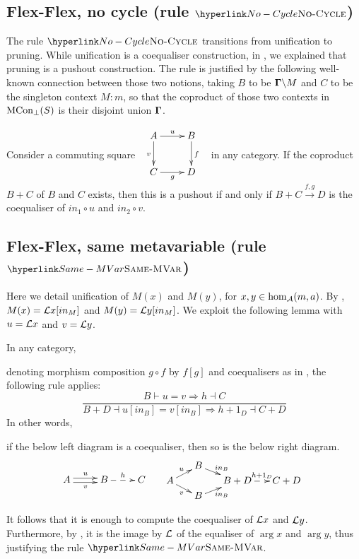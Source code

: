 \subsection[Flex-Rig, no cycle (rule No-Cycle)]{Flex-Flex, no cycle (rule $\protect\refrule{No-Cycle}$)}

\label{subsec:no-cycle}The rule $\refrule{No-Cycle}$ transitions
from unification to pruning. While unification is a coequaliser construction,
in , we explained that pruning is a pushout
construction. The rule is justified by the following well-known connection
between those two notions, taking $B$ to be $\dotmcontext{\Gamma}\backslash M$
and $C$ to be the singleton context $M:m$, so that the coproduct
of those two contexts in $\Thbot S$ is their disjoint union $\dotmcontext{\Gamma}$.
\begin{lemma}
Consider a commuting square $\begin{array}{c}
\xymatrix{A\ar[r]^{u}\ar[d]_{v} & B\ar[d]^{f}\\
C\ar[r]_{g} & D
}
\end{array}$ in any category. If the coproduct $B+C$ of $B$ and $C$ exists,
then this is a pushout if and only if $B+C\xrightarrow{f,g}D$ is
the coequaliser of $in_{1}\circ u$ and $in_{2}\circ v$. 
\end{lemma}

\subsection[Flex-Flex, same metavariable (rule Same-MVar)]{Flex-Flex, same metavariable (rule $\protect\refrule{Same-MVar}$)}

\label{subsec:flex-flex-same-metavar}Here we detail unification of
$M(x)$ and $M(y)$, for $x,y\in\hom_{{\cal A}}(m,a)$. By ,
$M(\arg x)={\cal L}\arg x[in_{M}]$ and $M(\arg y)={\cal L}\arg y[in_{M}]$.
We exploit the following lemma with $u={\cal L}\arg x$ and $v={\cal L}\arg y$.
\begin{lemma}
In any category, 
\begin{full}
denoting morphism composition $g\circ f$ by $f[g]$ and coequalisers
as in , the following rule applies:
\[
\dfrac{B\vdash u=v\Rightarrow h\dashv C}{B+D\dashv u[in_{B}]=v[in_{B}]\Rightarrow h+1_{D}\dashv C+D}
\]
In other words,
\end{full}
 if the below left diagram is a coequaliser, then so is the below
right diagram. \[
\xymatrix@R=2pt{A\ar@<+.5ex>[r]^{u}\ar@<-.5ex>[r]_{v} & B\ar@{-->}[r]^{h} & C}\quad\begin{array}{c}\xymatrix@C=1.5em@R=2pt{ & B\ar[rd]^{in_{B}}\\A\ar[ru]^{u}\ar[rd]_{v} &  & B+D\ar@{-->}[r]^{h+1_{D}} & C+D\\ & B\ar[ru]_{in_{B}}}\end{array}
\]
\end{lemma}
It follows that it is enough to compute the coequaliser of ${\cal L}\arg x$
and ${\cal L}\arg y$. Furthermore, by ,
it is the image by ${\cal L}$ of the equaliser of $\arg x$ and $\arg y$,
thus justifying the rule $\refrule{Same-MVar}$.

